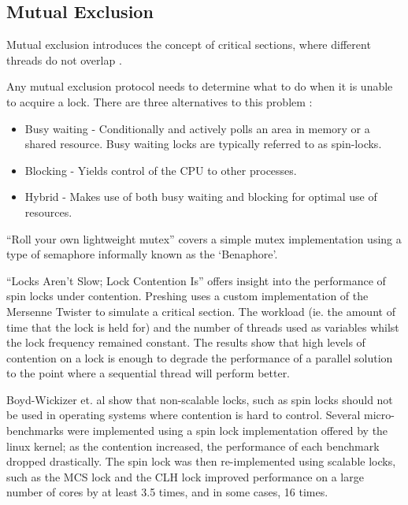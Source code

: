 \documentclass[a4paper, 12pt, titlepage]{article}
\begin{document}
\begin{singlespace}
\subsection{Mutual Exclusion}
Mutual exclusion introduces the concept of critical sections, where different threads do not overlap \cite[Chapter~2]{herlihy2020art}. 

Any mutual exclusion protocol needs to determine what to do when it is unable to acquire a lock. There are three alternatives to this problem \cite[Chapter~7]{herlihy2020art}:
\begin{itemize}
  \item Busy waiting - Conditionally and actively polls an area in memory or a shared resource. Busy waiting locks are typically referred to as spin-locks.
  \item Blocking - Yields control of the CPU to other processes.
  \item Hybrid - Makes use of both busy waiting and blocking for optimal use of resources.
\end{itemize}

``Roll your own lightweight mutex''\cite{preshingmutex} covers a simple mutex implementation using a type of semaphore informally known as the `Benaphore'\cite{haikubenaphore}.

``Locks Aren't Slow; Lock Contention Is''\cite{preshinglockcontentionslow} offers insight into the performance of spin locks under contention. Preshing uses a custom implementation of the Mersenne Twister \cite{matsumoto1998mersenne} to simulate a critical section. The workload (ie. the amount of time that the lock is held for) and the number of threads used as variables whilst the lock frequency remained constant. The results show that high levels of contention on a lock is enough to degrade the performance of a parallel solution to the point where a sequential thread will perform better.

Boyd-Wickizer et. al show that non-scalable locks, such as spin locks should not be used in operating systems where contention is hard to control. Several micro-benchmarks were implemented using a spin lock implementation offered by the linux kernel; as the contention increased, the performance of each benchmark dropped drastically. The spin lock was then re-implemented using scalable locks, such as the MCS lock \cite{mellor1991algorithms} and the CLH lock \cite{craig1993building,magnusson1994queue} improved performance on a large number of cores by at least 3.5 times, and in some cases, 16 times.


\end{singlespace}
\end{document}
